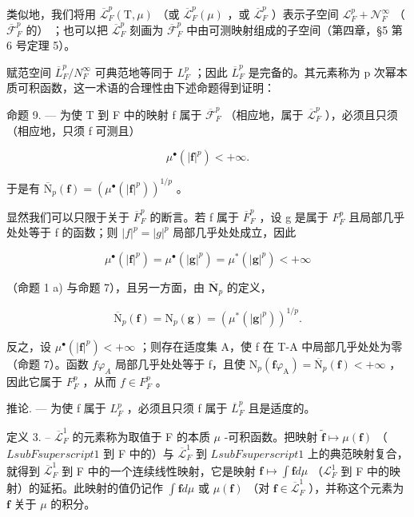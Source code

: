 类似地，我们将用 \(\overline{\mathcal{L}}_F^p (\mathrm{T},\mu)\) （或 \(\overline{\mathcal{L}}_F^p (\mu)\) ，或 \(\overline{\mathcal{L}}_F^p\) ）表示子空间 \(\mathcal{L}_F^p +\mathcal{N}_F^\infty\) （\(\overline{\mathcal{F}}_F^p\) 的） ；也可以把 \(\overline{\mathcal{L}}_F^p\) 刻画为 \(\overline{\mathcal{F}}_F^p\) 中由可测映射组成的子空间（第四章，§5 第 6 号定理 5）。

赋范空间 \(\overline{L}_{F}^{p}/N_{F}^{\infty}\) 可典范地等同于 \(L_{F}^{p}\) ；因此 \(\overline{L}_{F}^{p}\) 是完备的。其元素称为 p 次幂本质可积函数，这一术语的合理性由下述命题得到证明：

命题 9. --- 为使 T 到 F 中的映射 f 属于 \(\overline{\mathcal{F}}_F^p\) （相应地，属于 \(\overline{\mathcal{L}}_F^p\) ），必须且只须（相应地，只须 f 可测且）

\[
\mu^ {\bullet} (| \mathbf {f} | ^ {p}) <   + \infty .
\]

于是有 \(\overline{\mathrm{N}}_p(\mathbf{f}) = (\mu^\bullet (|\mathbf{f}|^p))^{1 / p}\) 。

显然我们可以只限于关于 \(\overline{F}_{F}^{p}\) 的断言。若 f 属于 \(\overline{F}_{F}^{p}\) ，设 g 是属于 \(F_{F}^{p}\) 且局部几乎处处等于 f 的函数；则 \(|f|^{p}=|g|^{p}\) 局部几乎处处成立，因此

\[
\mu^ {\bullet} (| \mathbf {f} | ^ {p}) = \mu^ {\bullet} (| \mathbf {g} | ^ {p}) = \mu^ {*} (| \mathbf {g} | ^ {p}) <   + \infty
\]

（命题 1 a) 与命题 7），且另一方面，由 \(\overline{\mathbf{N}}_p\) 的定义，

\[
\overline {{\mathrm{N}}} _ {p} (\mathbf {f}) = \mathrm{N} _ {p} (\mathbf {g}) = \left(\mu^ {*} (| \mathbf {g} | ^ {p})\right) ^ {1 / p}.
\]

反之，设 \(\mu^{\bullet}(|\mathbf{f}|^{p}) < +\infty\) ；则存在适度集 A，使 f 在 T-A 中局部几乎处处为零（命题 7）。函数 \(f\varphi_{A}\) 局部几乎处处等于 f，且使 \(\mathrm{N}_{p}(\mathbf{f}\varphi_{\mathrm{A}}) = \overline{\mathrm{N}}_{p}(\mathbf{f}) < +\infty\) ，因此它属于 \(F_{F}^{p}\) ，从而 \(f \in F_{F}^{p}\) 。

推论. --- 为使 f 属于 \(L_{F}^{p}\) ，必须且只须 f 属于 \(\overline{L}_{F}^{p}\) 且是适度的。

定义 3. -- \(\overline{\mathcal{L}}_F^1\) 的元素称为取值于 F 的本质 \(\mu\) -可积函数。把映射 \(\widetilde{\mathbf{f}} \mapsto \mu(\mathbf{f})\) （\(L sub F superscript 1\) 到 F 中的）与 \(\overline{\mathcal{L}}_F^1\) 到 \(L sub F superscript 1\) 上的典范映射复合，就得到 \(\overline{\mathcal{L}}_F^1\) 到 F 中的一个连续线性映射，它是映射 \(\mathbf{f} \mapsto \int \mathbf{f} d\mu\) （\(\mathcal{L}_F^1\) 到 F 中的映射）的延拓。此映射的值仍记作 \(\int \mathbf{f} d\mu\) 或 \(\mu(\mathbf{f})\) （对 \(\mathbf{f} \in \overline{\mathcal{L}}_F^1\) ），并称这个元素为 \(\mathbf{f}\) 关于 \(\mu\) 的积分。

